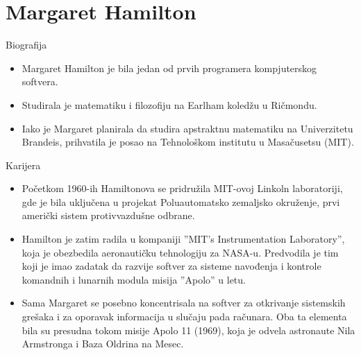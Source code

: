 \documentclass[aspectratio=169]{beamer}
\begin{document}
\section{Margaret Hamilton}
\begin{frame}{Biografija}

    \begin{itemize}
        \item<1-> Margaret Hamilton je bila jedan od prvih programera kompjuterskog softvera.
        
        \item<2-> Studirala je matematiku i filozofiju na Earlham koledžu u Ričmondu.
        
        \item<3->Iako je Margaret planirala da studira apstraktnu matematiku na Univerzitetu Brandeis, prihvatila je posao na Tehnološkom institutu u Masačusetsu (MIT).
    \end{itemize}


\end{frame}
\begin{frame}{Karijera}

    \begin{itemize}
        \item<1-> Početkom 1960-ih Hamiltonova se pridružila MIT-ovoj Linkoln laboratoriji, gde je bila uključena u projekat Poluautomatsko zemaljsko okruženje, prvi američki sistem protivvazdušne odbrane.
        
        \item<2->Hamilton je zatim radila u kompaniji ''MIT’s Instrumentation Laboratory'', koja je obezbedila aeronautičku tehnologiju za NASA-u. Predvodila je tim koji je imao zadatak da razvije softver za sisteme navođenja i kontrole komandnih i lunarnih modula misija ''Apolo'' u letu.
        
        \item<3-> Sama Margaret se posebno koncentrisala na softver za otkrivanje sistemskih grešaka i za oporavak informacija u slučaju pada računara. Oba ta elementa bila su presudna tokom misije Apolo 11 (1969), koja je odvela astronaute Nila Armstronga i Baza Oldrina na Mesec.
    \end{itemize}


\end{frame}
\end{document}
